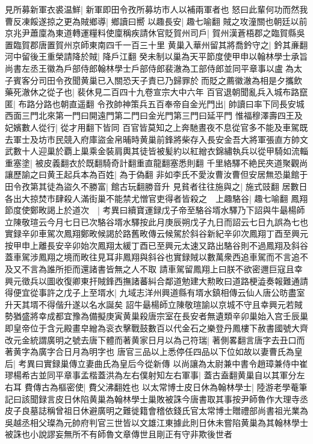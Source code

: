 見所募新軍衣裘温鮮|{
	新軍即田令孜所募坊市人以補兩軍者也}
怒曰此輩何功而然我曹反凍餒遂掠之更為賊鄉導|{
	鄉讀曰嚮}
以趣長安|{
	趣七喻翻}
賊之攻潼關也朝廷以前京兆尹蕭廩為東道轉運糧料使廩稱疾請休官貶賀州司戶|{
	賀州漢蒼梧郡之臨賀縣吳置臨賀郡唐置賀州京師東南四千一百三十里}
黄巢入華州留其將喬鈐守之|{
	鈐其亷翻}
河中留後王重榮請降於賊|{
	降戶江翻}
癸未制以巢為天平節度使甲申以翰林學士承旨尚書左丞王徽為戶部侍郎翰林學士戶部侍郎裴澈為工部侍郎並同平章事以盧為太子賓客分司田令孜聞黄巢已入關恐天子責已乃歸罪於而貶之薦徽澈為相是夕攜飲藥死澈休之從子也|{
	裴休見二百四十九卷宣宗大中六年}
百官退朝聞亂兵入城布路竄匿|{
	布路分路也朝直遥翻}
令孜帥神策兵五百奉帝自金光門出|{
	帥讀曰率下同長安城西面三門北來第一門曰開遠門第二門曰金光門第三門曰延平門}
惟福穆澤壽四王及妃嬪數人從行|{
	從才用翻下皆同}
百官皆莫知之上奔馳晝夜不息從官多不能及車駕既去軍士及坊市民競入府庫盜金帛晡時黄巢前鋒將柴存入長安金吾大將軍張直方帥文武數十人迎巢於覇上巢乘金裝肩輿其徒皆被髪約以紅繒衣錦繡執兵以從甲騎如流輜重塞塗|{
	被皮義翻衣於既翻騎奇計翻重直龍翻塞悉則翻}
千里絡驛不絶民夾道聚觀尚讓歷諭之曰黄王起兵本為百姓|{
	為于偽翻}
非如李氏不愛汝曹汝曹但安居無恐巢館于田令孜第其徒為盜久不勝富|{
	館古玩翻勝音升}
見貧者往往施與之|{
	施式豉翻}
居數日各出大掠焚市肆殺人滿街巢不能禁尤憎官吏得者皆殺之　上趣駱谷|{
	趣七喻翻}
鳳翔節度使鄭畋謁上於道次　|{
	考異曰續寶運録戊子帝至駱谷壻水驛乃下詔與牛朂楊師立陳敬瑄云今月七日已次駱谷壻水驛按此月庚辰朔戊子九日而詔云七日九誤為七也實録辛卯車駕次鳳翔鄭畋候謁於路舊畋傳云候駕於斜谷新紀辛卯次鳳翔丁酉至興元按甲申上離長安辛卯始次鳳翔太緩丁酉已至興元太速又路出駱谷則不過鳳翔及斜谷蓋車駕涉鳳翔之境而畋往見耳非鳳翔與斜谷也實録賊以數萬衆西追車駕而不言追不及又不言為誰所拒而還諸書皆無之人不取}
請車駕留鳳翔上曰朕不欲密邇巨寇且幸興元徵兵以圖收復卿東扞賊鋒西撫諸蕃糾合鄰道勉建大勲畋曰道路梗澁奏報難通請得便宜從事許之戊子上至壻水|{
	九域志洋州興道縣有壻水鎮相傳云仙人唐公昉盡室升天其壻不得偕升遂以名水誕矣}
詔牛朂楊師立陳敬瑄諭以京城不守且幸興元若賊勢猶盛將幸成都宜豫為備擬庚寅黄巢殺唐宗室在長安者無遺類辛卯巢始入宫壬辰巢即皇帝位于含元殿畫皁繒為衮衣擊戰鼓數百以代金石之樂登丹鳳樓下赦書國號大齊改元金統謂廣明之號去唐下體而著黄家日月以為己符瑞|{
	著側畧翻言唐字去丑口而著黄字為廣字合日月為明字也}
唐官三品以上悉停任四品以下位如故以妻曹氏為皇后|{
	考異曰實録巢傳立妻曲氏為皇后今從新傳}
以尚讓為太尉兼中書令趙璋兼侍中崔璆楊希古並同平章事孟楷蓋洪為左右僕射知左右軍事|{
	蓋古盍翻黄巢自以其軍分左右耳}
費傳古為樞密使|{
	費父沸翻姓也}
以太常博士皮日休為翰林學士|{
	陸游老學菴筆記曰該聞録言皮日休陷黄巢為翰林學士巢敗被誅今唐書取其事按尹師魯作大理寺丞皮子良墓誌稱曾祖日休避廣明之難徙籍會稽依錢氏官太常博士贈禮部尚書祖光業為吳越丞相父璨為元帥府判官三世皆以文雄江東據此則日休未嘗陷黄巢為其翰林學士被誅也小說謬妄無所不有師魯文章傳世且剛正有守非欺後世者}
